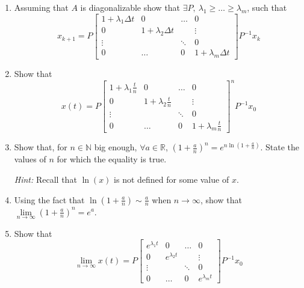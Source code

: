 \begin{enumerate}
\item Assuming that $A$ is diagonalizable show that $\exists P,\ \lambda_1 \geq \dots \geq \lambda_m$, such that 
	\[ x_{k+1} = P \begin{bmatrix}
        1 + \lambda_1 \Delta t    &0       &\dots  &0\\
        0      &1 + \lambda_2 \Delta t     &       &\vdots\\
        \vdots &        &\ddots &0\\ 
        0      &\dots   &0      & 1 + \lambda_m \Delta t
    \end{bmatrix} P^{-1}  x_k
    \]

\sol{}
\item Show that 
    \[  x(t) = P\begin{bmatrix}
        1 + \lambda_1 \frac{t}{n}    &0       &\dots  &0\\
        0      &1 + \lambda_2 \frac{t}{n}     &       &\vdots\\
        \vdots &        &\ddots &0\\ 
        0      &\dots   &0      & 1 + \lambda_m \frac{t}{n}
    \end{bmatrix}^n P^{-1} x_0
    \]

\sol{}
\item Show that, for $n\in \mathbb{N}$ big enough, $\forall a\in \mathbb{R}$, $(1+\frac{a}{n})^n = e^{n \ln (1+\frac{a}{n})}$. State the values of $n$ for which the equality is true.

\textit{Hint:} Recall that $\ln(x)$ is not defined for some value of $x$.

\sol{}
\item Using the fact that $\ln (1+\frac{a}{n}) \sim \frac{a}{n}$ when $n\rightarrow\infty$, show that $\lim\limits_{n\rightarrow\infty}(1+\frac{a}{n})^n = e^a$.

\sol{}
\item Show that 
    \[ \lim\limits_{n\rightarrow\infty} x(t) = P \begin{bmatrix}
        e^{\lambda_1 t}    &0       &\dots  &0\\
        0      & e^{\lambda_2 t}     &       &\vdots\\
        \vdots &        &\ddots &0\\ 
        0      &\dots   &0      & e^{\lambda_m t}
    \end{bmatrix} P^{-1}  x_0
    \]

\sol{}
\end{enumerate}

